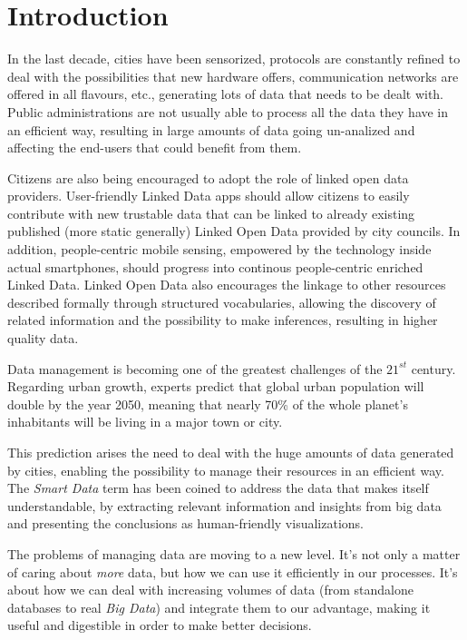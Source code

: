 \section{Introduction}
\label{sec:introduction}

In the last decade, cities have been sensorized, protocols are constantly refined to deal with the possibilities that new hardware offers, communication networks are offered in all flavours, etc., generating lots of data that needs to be dealt with. Public administrations are not usually able to process all the data they have in an efficient way, resulting in large amounts of data going un-analized and affecting the end-users that could benefit from them.

Citizens are also being encouraged to adopt the role of linked open data providers. User-friendly Linked Data apps should allow citizens to easily contribute with new trustable data that can be linked to already existing published (more static generally) Linked Open Data provided by city councils. In addition, people-centric mobile sensing, empowered by the technology inside actual smartphones, should progress into continous people-centric enriched Linked Data. Linked Open Data also encourages the linkage to other resources described formally through structured vocabularies, allowing the discovery of related information and the possibility to make inferences, resulting in higher quality data.

Data management is becoming one of the greatest challenges of the $21^{st}$ century. Regarding urban growth, experts predict that global urban population will double by the year 2050, meaning that nearly 70\% of the whole planet's inhabitants will be living in a major town or city.

This prediction arises the need to deal with the huge amounts of data generated by cities, enabling the possibility to manage their resources in an efficient way. The \textit{Smart Data} term has been coined to address the data that makes itself understandable, by extracting relevant information and insights from big data and presenting the conclusions as human-friendly visualizations.

The problems of managing data are moving to a new level. It's not only a matter of caring about \textit{more} data, but how we can use it efficiently in our processes. It's about how we can deal with increasing volumes of data (from standalone databases to real \textit{Big Data}) and integrate them to our advantage, making it useful and digestible in order to make better decisions.

